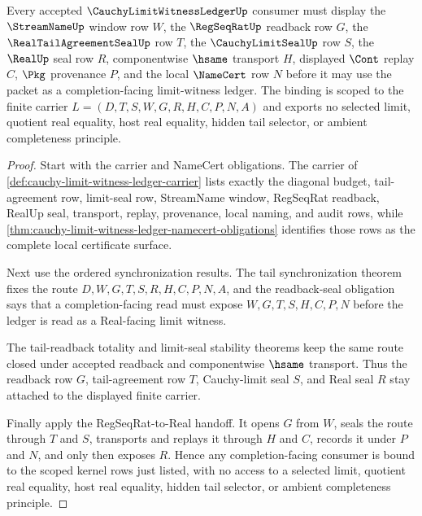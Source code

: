 \begin{theorem}
\label{thm:cauchy-limit-witness-ledger-scoped-kernel-binding}
Every accepted $\CauchyLimitWitnessLedgerUp$ consumer must display the $\StreamNameUp$ window row $W$, the $\RegSeqRatUp$ readback row $G$, the $\RealTailAgreementSealUp$ row $T$, the $\CauchyLimitSealUp$ row $S$, the $\RealUp$ seal row $R$, componentwise $\hsame$ transport $H$, displayed $\Cont$ replay $C$, $\Pkg$ provenance $P$, and the local $\NameCert$ row $N$ before it may use the packet as a completion-facing limit-witness ledger. The binding is scoped to the finite carrier $L=(D,T,S,W,G,R,H,C,P,N,A)$ and exports no selected limit, quotient real equality, host real equality, hidden tail selector, or ambient completeness principle.
\end{theorem}
\begin{proof}
Start with the carrier and NameCert obligations. The carrier of \autoref{def:cauchy-limit-witness-ledger-carrier} lists exactly the diagonal budget, tail-agreement row, limit-seal row, StreamName window, RegSeqRat readback, RealUp seal, transport, replay, provenance, local naming, and audit rows, while \autoref{thm:cauchy-limit-witness-ledger-namecert-obligations} identifies those rows as the complete local certificate surface.

Next use the ordered synchronization results. The tail synchronization theorem fixes the route $D,W,G,T,S,R,H,C,P,N,A$, and the readback-seal obligation says that a completion-facing read must expose $W,G,T,S,H,C,P,N$ before the ledger is read as a Real-facing limit witness.

The tail-readback totality and limit-seal stability theorems keep the same route closed under accepted readback and componentwise $\hsame$ transport. Thus the readback row $G$, tail-agreement row $T$, Cauchy-limit seal $S$, and Real seal $R$ stay attached to the displayed finite carrier.

Finally apply the RegSeqRat-to-Real handoff. It opens $G$ from $W$, seals the route through $T$ and $S$, transports and replays it through $H$ and $C$, records it under $P$ and $N$, and only then exposes $R$. Hence any completion-facing consumer is bound to the scoped kernel rows just listed, with no access to a selected limit, quotient real equality, host real equality, hidden tail selector, or ambient completeness principle.
\end{proof}


